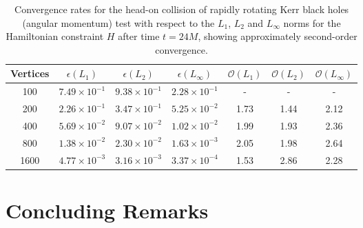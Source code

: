 \documentclass{article}
\begin{document}
\begin{table}
\centering
\begin{tabular}{|c|c|c|c|c|c|c|}
\hline
Vertices & ${\epsilon \left( L_1 \right)}$ & ${\epsilon \left( L_2 \right)}$ & ${\epsilon \left( L_{\infty} \right)}$ & ${\mathcal{O} \left( L_1 \right)}$ & ${\mathcal{O} \left( L_2 \right)}$ & ${\mathcal{O} \left( L_{\infty} \right)}$\\
\hline\hline
100 & ${7.49 \times 10^{-1}}$ & ${9.38 \times 10^{-1}}$ & ${2.28 \times 10^{-1}}$ & - & - & -\\
\hline
200 & ${2.26 \times 10^{-1}}$ & ${3.47 \times 10^{-1}}$ & ${5.25 \times 10^{-2}}$ & 1.73 & 1.44 & 2.12\\
\hline
400 & ${5.69 \times 10^{-2}}$ & ${9.07 \times 10^{-2}}$ & ${1.02 \times 10^{-2}}$ & 1.99 & 1.93 & 2.36\\
\hline
800 & ${1.38 \times 10^{-2}}$ & ${2.30 \times 10^{-2}}$ & ${1.63 \times 10^{-3}}$ & 2.05 & 1.98 & 2.64\\
\hline
1600 & ${4.77 \times 10^{-3}}$ & ${3.16 \times 10^{-3}}$ & ${3.37 \times 10^{-4}}$ & 1.53 & 2.86 & 2.28\\
\hline
\end{tabular}
\caption{Convergence rates for the head-on collision of rapidly rotating Kerr black holes (angular momentum) test with respect to the ${L_1}$, ${L_2}$ and ${L_{\infty}}$ norms for the Hamiltonian constraint $H$ after time ${t = 24 M}$, showing approximately second-order convergence.}
\label{tab:Table7}
\end{table}

\clearpage

\section{Concluding Remarks}
\label{sec:Section6}
\end{document}
